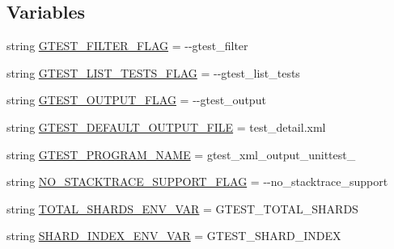 \subsection*{Variables}
\begin{DoxyCompactItemize}
\item 
string \mbox{\hyperlink{namespacegoogletest_1_1test_1_1gtest__xml__output__unittest_a9555e84660b4b51c34e78cc6af00b32a}{G\+T\+E\+S\+T\+\_\+\+F\+I\+L\+T\+E\+R\+\_\+\+F\+L\+AG}} = \textquotesingle{}-\/-\/gtest\+\_\+filter\textquotesingle{}
\item 
string \mbox{\hyperlink{namespacegoogletest_1_1test_1_1gtest__xml__output__unittest_ae086e3b5d8fa22c42ea5f211851580f7}{G\+T\+E\+S\+T\+\_\+\+L\+I\+S\+T\+\_\+\+T\+E\+S\+T\+S\+\_\+\+F\+L\+AG}} = \textquotesingle{}-\/-\/gtest\+\_\+list\+\_\+tests\textquotesingle{}
\item 
string \mbox{\hyperlink{namespacegoogletest_1_1test_1_1gtest__xml__output__unittest_a69017f9536ad925430ae299283f1d251}{G\+T\+E\+S\+T\+\_\+\+O\+U\+T\+P\+U\+T\+\_\+\+F\+L\+AG}} = \textquotesingle{}-\/-\/gtest\+\_\+output\textquotesingle{}
\item 
string \mbox{\hyperlink{namespacegoogletest_1_1test_1_1gtest__xml__output__unittest_a4f8c477712fc8008e6dc063be1430af4}{G\+T\+E\+S\+T\+\_\+\+D\+E\+F\+A\+U\+L\+T\+\_\+\+O\+U\+T\+P\+U\+T\+\_\+\+F\+I\+LE}} = \textquotesingle{}test\+\_\+detail.\+xml\textquotesingle{}
\item 
string \mbox{\hyperlink{namespacegoogletest_1_1test_1_1gtest__xml__output__unittest_a7e143d3a4380948bda865cb00eabeb8b}{G\+T\+E\+S\+T\+\_\+\+P\+R\+O\+G\+R\+A\+M\+\_\+\+N\+A\+ME}} = \textquotesingle{}gtest\+\_\+xml\+\_\+output\+\_\+unittest\+\_\+\textquotesingle{}
\item 
string \mbox{\hyperlink{namespacegoogletest_1_1test_1_1gtest__xml__output__unittest_ad115a905f8692f04e9f5c4305e39584d}{N\+O\+\_\+\+S\+T\+A\+C\+K\+T\+R\+A\+C\+E\+\_\+\+S\+U\+P\+P\+O\+R\+T\+\_\+\+F\+L\+AG}} = \textquotesingle{}-\/-\/no\+\_\+stacktrace\+\_\+support\textquotesingle{}
\item 
string \mbox{\hyperlink{namespacegoogletest_1_1test_1_1gtest__xml__output__unittest_a8f1abe68fa36d2fbf0becc6c28953da5}{T\+O\+T\+A\+L\+\_\+\+S\+H\+A\+R\+D\+S\+\_\+\+E\+N\+V\+\_\+\+V\+AR}} = \textquotesingle{}G\+T\+E\+S\+T\+\_\+\+T\+O\+T\+A\+L\+\_\+\+S\+H\+A\+R\+DS\textquotesingle{}
\item 
string \mbox{\hyperlink{namespacegoogletest_1_1test_1_1gtest__xml__output__unittest_a9cbc91e41f5198619feb19ff8b5f25a2}{S\+H\+A\+R\+D\+\_\+\+I\+N\+D\+E\+X\+\_\+\+E\+N\+V\+\_\+\+V\+AR}} = \textquotesingle{}G\+T\+E\+S\+T\+\_\+\+S\+H\+A\+R\+D\+\_\+\+I\+N\+D\+EX\textquotesingle{}

\end{DoxyCompactItemize}
